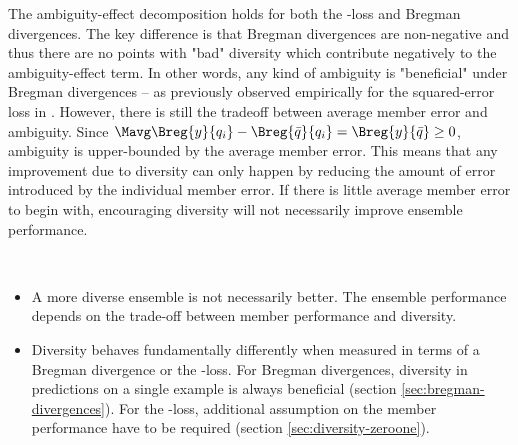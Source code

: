 \documentclass[
	twoside=false, %
]{kaobook}
\begin{document}
The ambiguity-effect decomposition holds for both the \zeroone-loss and Bregman divergences. The key difference is that Bregman divergences are non-negative and thus there are no points with "bad" diversity which contribute negatively to the ambiguity-effect term. In other words, any kind of ambiguity is "beneficial" under Bregman divergences -- as previously observed empirically for the squared-error loss in \cite{abe_PathologiesPredictiveDiversity_2023}.
However, there is still the tradeoff between average member error and ambiguity. Since 
$ \Mavg \Breg{y}{q_{i}} - \Breg{\bar{q}}{q_{i}} = \Breg{y}{\bar{q}} \geq 0$, 
ambiguity is upper-bounded by the average member error. This means that any improvement due to diversity can only happen by reducing the amount of error introduced by the individual member error. If there is little average member error to begin with, encouraging diversity will not necessarily improve ensemble performance. 

\begin{observation} ~~
\begin{itemize}
\item A more diverse ensemble is not necessarily better. The ensemble performance depends on the trade-off between member performance and diversity.
\item Diversity behaves fundamentally differently when measured in terms of a Bregman divergence or the \zeroone-loss. For Bregman divergences, diversity in predictions on a single example is always beneficial (section \ref{sec:bregman-divergences}). For the \zeroone-loss, additional assumption on the member performance have to be required (section \ref{sec:diversity-zeroone}). 
\end{itemize}
\end{observation}


\end{document}
